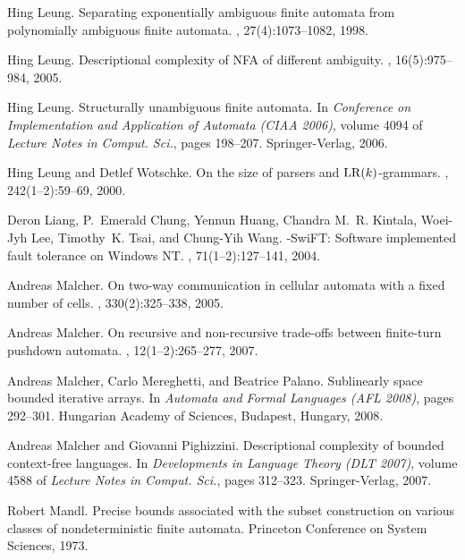\documentclass[copyright]{eptcs}
\begin{document}
\begin{thebibliography}{10}
Hing Leung.
\newblock Separating exponentially ambiguous finite automata from polynomially
  ambiguous finite automata.
, 27(4):1073--1082, 1998.

Hing Leung.
\newblock Descriptional complexity of {NFA} of different ambiguity.
, 16(5):975--984, 2005.

Hing Leung.
\newblock Structurally unambiguous finite automata.
\newblock In {\em Conference on Implementation and Application of Automata
  (CIAA 2006)}, volume 4094 of {\em Lecture Notes in Comput. Sci.}, pages
  198--207. Springer-Verlag, 2006.

Hing Leung and Detlef Wotschke.
\newblock On the size of parsers and {${\rm LR}(k)$}-grammars.
, 242(1--2):59--69, 2000.

Deron Liang, P.~Emerald Chung, Yennun Huang, Chandra M.~R. Kintala, Woei-Jyh
  Lee, Timothy~K. Tsai, and Chung-Yih Wang.
-{SwiFT}: Software implemented fault tolerance on {W}indows {NT}.
, 71(1--2):127--141, 2004.

Andreas Malcher.
\newblock On two-way communication in cellular automata with a fixed number of
  cells.
, 330(2):325--338, 2005.

Andreas Malcher.
\newblock On recursive and non-recursive trade-offs between finite-turn
  pushdown automata.
, 12(1--2):265--277, 2007.

Andreas Malcher, Carlo Mereghetti, and Beatrice Palano.
\newblock Sublinearly space bounded iterative arrays.
\newblock In {\em Automata and Formal Languages (AFL 2008)}, pages 292--301.
  Hungarian Academy of Sciences, Budapest, Hungary, 2008.

Andreas Malcher and Giovanni Pighizzini.
\newblock Descriptional complexity of bounded context-free languages.
\newblock In {\em Developments in Language Theory (DLT 2007)}, volume 4588 of
  {\em Lecture Notes in Comput. Sci.}, pages 312--323. Springer-Verlag, 2007.

Robert Mandl.
\newblock Precise bounds associated with the subset construction on various
  classes of nondeterministic finite automata.
\newblock Princeton Conference on System Sciences, 1973.


\end{thebibliography}
\end{document}
